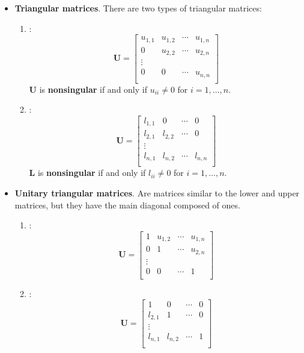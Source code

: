 \begin{itemize}
	\item \textbf{Triangular matrices}. There are two types of triangular matrices:
	\begin{enumerate}
		\item {}:
		\begin{equation*}
			\mathbf{U} = \begin{bmatrix}
				u_{1,1} & u_{1,2} & \cdots & u_{1,n} \\
				0 & u_{2,2} & \cdots & u_{2,n} \\
				\vdots & & & \\
				0 & 0 & \cdots & u_{n,n} \\
			\end{bmatrix}
		\end{equation*}
		$\mathbf{U}$ is \textbf{nonsingular} if and only if $u_{ii} \ne 0$ for $i = 1, \dots, n$.

		\item {}:
		\begin{equation*}
			\mathbf{U} = \begin{bmatrix}
				l_{1,1} & 0 & \cdots & 0 \\
				l_{2,1} & l_{2,2} & \cdots & 0 \\
				\vdots & & & \\
				l_{n,1} & l_{n,2} & \cdots & l_{n,n} \\
			\end{bmatrix}
		\end{equation*}
		$\mathbf{L}$ is \textbf{nonsingular} if and only if $l_{ii} \ne 0$ for $i = 1, \dots, n$.
	\end{enumerate}
	
	\item \textbf{Unitary triangular matrices}. Are matrices similar to the lower and upper matrices, but they have the main diagonal composed of ones.
	\begin{enumerate}
		\item {}:
		\begin{equation*}
			\mathbf{U} = \begin{bmatrix}
				1 & u_{1,2} & \cdots & u_{1,n} \\
				0 & 1 & \cdots & u_{2,n} \\
				\vdots & & & \\
				0 & 0 & \cdots & 1 \\
			\end{bmatrix}
		\end{equation*}

		\item {}:
		\begin{equation*}
			\mathbf{U} = \begin{bmatrix}
				1 & 0 & \cdots & 0 \\
				l_{2,1} & 1 & \cdots & 0 \\
				\vdots & & & \\
				l_{n,1} & l_{n,2} & \cdots & 1 \\
			\end{bmatrix}
		\end{equation*}
	\end{enumerate}
\end{itemize}